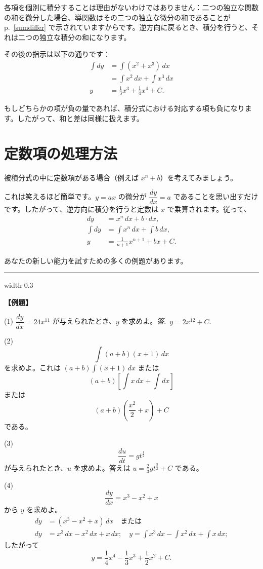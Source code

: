 \documentclass[a4paper,11pt,openany]{ltjsbook}
\newcommand{\tb}{\par\vspace{2mm}\hrule width 0.3\textwidth\vspace{2mm}\par}
\newcommand{\Pageref}[2][p.]{#1~\ref{#2}}
\begin{document}
各項を個別に積分することは理由がないわけではありません：二つの独立な関数の和を微分した場合、導関数はその二つの独立な微分の和であることが \Pageref{sumdiffer} で示されていますからです。逆方向に戻るとき、積分を行うと、それは二つの独立な積分の和になります。

その後の指示は以下の通りです：
\begin{align*}
\int dy
  &= \int (x^2 + x^3)\, dx \\
  &= \int x^2\, dx + \int x^3\, dx   \\
y &= \frac{1}{3} x^3 + \frac{1}{4} x^4 + C.
\end{align*}

もしどちらかの項が負の量であれば、積分式における対応する項も負になります。したがって、和と差は同様に扱えます。

\section*{定数項の処理方法}

被積分式の中に定数項がある場合（例えば $x^n + b$）を考えてみましょう。

これは笑えるほど簡単です。$y = ax$ の微分が $\dfrac{dy}{dx} = a$ であることを思い出すだけです。したがって、逆方向に積分を行うと定数は $x$ で乗算されます。従って、
\begin{align*}
dy &= x^n\, dx + b \cdot dx,  \\
\int dy &= \int x^n\, dx + \int b\, dx, \\
y &= \frac{1}{n+1} x^{n+1} + bx + C.
\end{align*}

あなたの新しい能力を試すための多くの例題があります。

\tb

\par\medskip\noindent\textbf{【例題】}\par
(1) $\dfrac{dy}{dx} = 24x^{11}$ が与えられたとき、$y$ を求めよ。\qquad \textit{答}.\ $y = 2x^{12} + C$.

(2) $$\int (a + b)(x + 1)\, dx$$ を求めよ。これは $(a + b) \int (x + 1)\, dx$ または $$(a + b) \left[\int x\, dx + \int dx\right]$$ または $$(a + b) \left(\frac{x^2}{2} + x\right) + C$$ である。

(3) $$\frac{du}{dt} = gt^{\frac{1}{2}}$$ が与えられたとき、$u$ を求めよ。答えは $u = \frac{2}{3} gt^{\frac{3}{2}} + C$ である。

(4) $$\frac{dy}{dx} = x^3 - x^2 + x$$ から $y$ を求めよ。
\begin{align*}
dy &= (x^3 - x^2 + x)\, dx \quad \text{または} \\
dy &= x^3\, dx - x^2\, dx + x\, dx; \quad
y = \int x^3\, dx - \int x^2\, dx + \int x\, dx;
\end{align*}
したがって
\[
 y = \frac{1}{4} x^4 - \frac{1}{3} x^3 + \frac{1}{2} x^2 + C. 
\]
\end{document}
